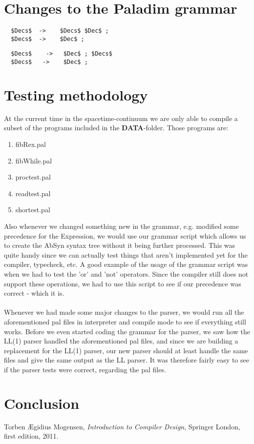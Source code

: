 \documentclass[12pt,a4paper]{article}
\begin{document}
\section{Changes to the Paladim grammar}
\begin{lstlisting}
  $Decs$  ->    $Decs$ $Dec$ ; 
  $Decs$  ->    $Dec$ ;
\end{lstlisting}
\begin{lstlisting}
  $Decs$    ->   $Dec$ ; $Decs$
  $Decs$   ->    $Dec$ ;
\end{lstlisting}

\section{Testing methodology}
At the current time in the spacetime-continuum we are only able to compile a subset
of the programs included in the \textbf{DATA}-folder. Those programs are:\\
\begin{enumerate}
  \item fibRex.pal
  \item fibWhile.pal
  \item proctest.pal
  \item readtest.pal
  \item shortest.pal
\end{enumerate}

Also whenever we changed something new in the grammar, e.g. modified some precedence for the Expression, we would use our grammar
script which allows us to create the AbSyn syntax tree without it being further processed. This was quite handy since we can actually
test things that aren't implemented yet for the compiler, typecheck, etc. A good example of the usage of the grammar script was
when we had to test the 'or' and 'not' operators. Since the compiler still does not support these operations, we had to use this script
to see if our precedence was correct - which it is.
\\
\\
Whenever we had made some major changes to the parser, we would run all the aforementioned pal files
in interpreter and compile mode to see if everything still works. Before we even started coding the grammar for the parser, we 
saw how the LL(1) parser handled the aforementioned pal files, and since we are building a replacement for the LL(1) parser, our new
parser should at least handle the same files and give the same output as the LL parser. It was therefore fairly easy to see if the parser
tests were correct, regarding the pal files.


\section{Conclusion}

\begin{thebibliography}{9}
    Torben Ægidius Mogensen,
    \emph{Introduction to Compiler Design},
    Springer London, first edition, 2011.
\end{thebibliography}
\end{document}
